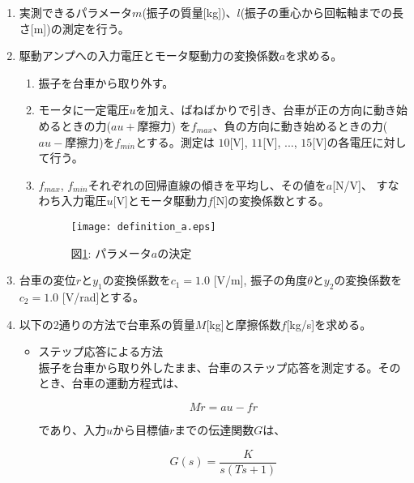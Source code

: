 \documentclass[a4j,11pt,twoside]{jbook}
\begin{document}
\begin{enumerate}
    \item 実測できるパラメータ$m$(振子の質量[kg])、$l$(振子の重心から回転軸までの長さ[m])の測定を行う。
    \item 駆動アンプへの入力電圧とモータ駆動力の変換係数$a$を求める。
    \begin{enumerate}
        \item 振子を台車から取り外す。
        \item モータに一定電圧$u$を加え、ばねばかりで引き、台車が正の方向に動き始めるときの力($au+$摩擦力)
        を$f_{max}$、負の方向に動き始めるときの力($au-$摩擦力)を$f_{min}$とする。測定は
        $10$[V], $11$[V], ..., $15$[V]の各電圧に対して行う。
        \item $f_{max}$, $f_{min}$それぞれの回帰直線の傾きを平均し、その値を$a$[N/V]、
        すなわち入力電圧$u$[V]とモータ駆動力$f$[N]の変換係数とする。
        \begin{figure}[htbp]
            \begin{center}
                \texttt{[image: definition\_a.eps]}
                \caption{図\ref{definition_a}: パラメータ$a$の決定}
                \label{definition_a}
            \end{center}
        \end{figure}
    \end{enumerate}

    \item 台車の変位$r$と$y_{1}$の変換係数を$c_{1} = 1.0$ [V/m], 
    振子の角度$\theta$と$y_{2}$の変換係数を$c_{2} = 1.0$ [V/rad]とする。

    \item 以下の2通りの方法で台車系の質量$M$[kg]と摩擦係数$f$[kg/s]を求める。
    \begin{itemize}
        \item ステップ応答による方法　\\
        \quad 振子を台車から取り外したまま、台車のステップ応答を測定する。そのとき、台車の運動方程式は、

        \begin{equation}
            M \ddot r = au - fr
            \label{eq_model}
        \end{equation}

        であり、入力$u$から目標値$r$までの伝達関数$G$は、

        \begin{equation}
            G(s) = \frac{K}{s(Ts + 1)}
        \end{equation}


\end{itemize}
\end{enumerate}
\end{document}
